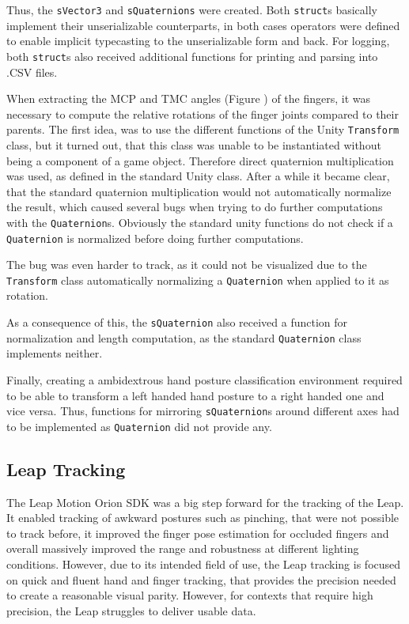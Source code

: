 Thus, the \texttt{sVector3} and \texttt{sQuaternions} were created. Both \texttt{struct}s basically implement their unserializable counterparts, in both cases operators were defined to enable implicit typecasting to the unserializable form and back. For logging, both \texttt{struct}s also received additional functions for printing and parsing into .CSV files.

When extracting the MCP and TMC angles (Figure \cite{fig:anatomytotal}) of the fingers, it was necessary to compute the relative rotations of the finger joints compared to their parents. The first idea, was to use the different functions of the Unity \texttt{Transform} class, but it turned out, that this class was unable to be instantiated without being a component of a game object. Therefore direct quaternion multiplication was used, as defined in the standard Unity class. After a while it became clear, that the standard quaternion multiplication would not automatically normalize the result, which caused several bugs when trying to do further computations with the \texttt{Quaternion}s. Obviously the standard unity functions do not check if a \texttt{Quaternion} is normalized before doing further computations. 

The bug was even harder to track, as it could not be visualized due to the \texttt{Transform} class automatically normalizing a \texttt{Quaternion} when applied to it as rotation.

As a consequence of this, the \texttt{sQuaternion} also received a function for normalization and length computation, as the standard \texttt{Quaternion} class implements neither.

Finally, creating a ambidextrous hand posture classification environment required to be able to transform a left handed hand posture to a right handed one and vice versa. Thus, functions for mirroring \texttt{sQuaternion}s around different axes had to be implemented as \texttt{Quaternion} did not provide any.

\subsection{Leap Tracking}

The Leap Motion Orion SDK was a big step forward for the tracking of the Leap. It enabled tracking of awkward postures such as pinching, that were not possible to track before, it improved the finger pose estimation for occluded fingers and overall massively improved the range and robustness at different lighting conditions. However, due to its intended field of use, the Leap tracking is focused on quick and fluent hand and finger tracking, that provides the precision needed to create a reasonable visual parity. However, for contexts that require high precision, the Leap struggles to deliver usable data. 

